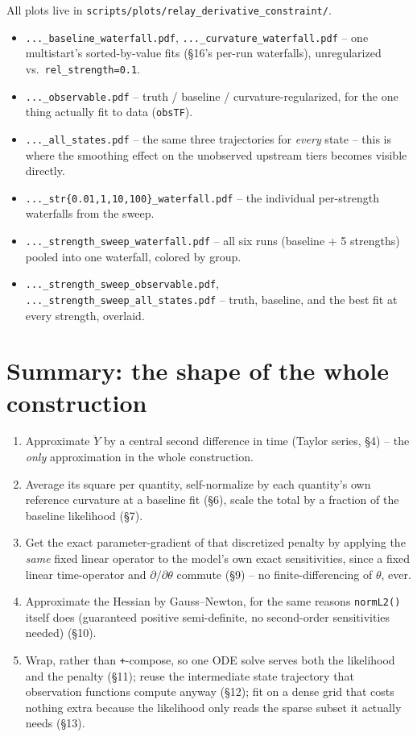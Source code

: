 \documentclass[11pt]{article}
\newcommand{\code}[1]{\texttt{#1}}
\newcommand{\file}[1]{\textcolor{black!60}{\texttt{#1}}}
\begin{document}
All plots live in \file{scripts/plots/relay\_derivative\_constraint/}.
\begin{itemize}[nosep]
  \item \file{...\_baseline\_waterfall.pdf}, \file{...\_curvature\_waterfall.pdf} --
  one multistart's sorted-by-value fits (\S16's per-run waterfalls), unregularized
  vs.\ \code{rel\_strength=0.1}.
  \item \file{...\_observable.pdf} -- truth / baseline / curvature-regularized,
  for the one thing actually fit to data (\code{obsTF}).
  \item \file{...\_all\_states.pdf} -- the same three trajectories for
  \emph{every} state -- this is where the smoothing effect on the unobserved
  upstream tiers becomes visible directly.
  \item \file{...\_str\{0.01,1,10,100\}\_waterfall.pdf} -- the individual
  per-strength waterfalls from the sweep.
  \item \file{...\_strength\_sweep\_waterfall.pdf} -- all six runs (baseline
  + 5 strengths) pooled into one waterfall, colored by group.
  \item \file{...\_strength\_sweep\_observable.pdf},
  \file{...\_strength\_sweep\_all\_states.pdf} -- truth, baseline, and the
  best fit at every strength, overlaid.
\end{itemize}

\section{Summary: the shape of the whole construction}

\begin{enumerate}[nosep]
  \item Approximate $\ddot Y$ by a central second difference in time
  (Taylor series, \S4) -- the \emph{only} approximation in the whole
  construction.
  \item Average its square per quantity, self-normalize by each quantity's
  own reference curvature at a baseline fit (\S6), scale the total by a
  fraction of the baseline likelihood (\S7).
  \item Get the exact parameter-gradient of that discretized penalty by
  applying the \emph{same} fixed linear operator to the model's own exact
  sensitivities, since a fixed linear time-operator and
  $\partial/\partial\theta$ commute (\S9) -- no finite-differencing of
  $\theta$, ever.
  \item Approximate the Hessian by Gauss--Newton, for the same reasons
  \code{normL2()} itself does (guaranteed positive semi-definite, no
  second-order sensitivities needed) (\S10).
  \item Wrap, rather than \code{+}-compose, so one ODE solve serves both
  the likelihood and the penalty (\S11); reuse the intermediate state
  trajectory that observation functions compute anyway (\S12); fit on a
  dense grid that costs nothing extra because the likelihood only reads
  the sparse subset it actually needs (\S13).
\end{enumerate}
\end{document}

